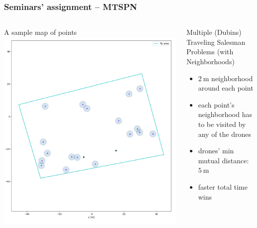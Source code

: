 \documentclass[aspectratio=1610]{beamer}
\newcommand{\unit}[2]{$#1~\ensuremath{\mathrm{#2}}$}
\begin{document}
\begin{frame}
  \frametitle{Seminars' assignment -- MTSPN}

  \begin{columns}[c]

    \begin{block}{A sample map of points}
      \includegraphics[width=1.0\textwidth]{./fig/tsp_points.png}
    \end{block}

    \begin{block}{Multiple (Dubins) Traveling Salesman Problems (with Neighborhoods)}
      \begin{itemize}
        \item \unit{2}{m} neighborhood around each point
        \item each point's neighborhood has to be visited by any of the drones
        \item drones' min mutual distance: \unit{5}{m}
        \item faster total time wins
      \end{itemize}
    \end{block}


\end{columns}
\end{frame}
\end{document}
